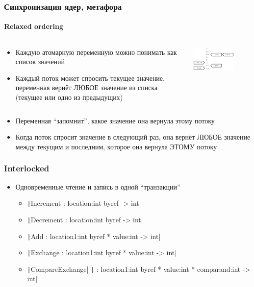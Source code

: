\documentclass[xetex,mathserif,serif]{beamer}
\begin{document}
	\begin{frame}
		\frametitle{Синхронизация ядер, метафора}
		\framesubtitle{Relaxed ordering}
		\begin{columns}
			\begin{column}{0.6\textwidth}
				\begin{itemize}
					\item Каждую атомарную переменную можно понимать как список значений
					\item Каждый поток может спросить текущее значение, переменная вернёт ЛЮБОЕ значение из списка (текущее или одно из предыдущих)
				\end{itemize}
			\end{column}
			\begin{column}{0.4\textwidth}
				\begin{center}
					\includegraphics[width=0.7\textwidth]{relaxedOrdering.png}
				\end{center}
			\end{column}
		\end{columns}
		\begin{itemize}
			\item Переменная ``запомнит'', какое значение она вернула этому потоку
			\item Когда поток спросит значение в следующий раз, она вернёт ЛЮБОЕ значение между текущим и последним, которое она вернула ЭТОМУ потоку
		\end{itemize}
	\end{frame}

	\begin{frame}
		\frametitle{Interlocked}
		\begin{itemize}
			\item Одновременные чтение и запись в одной ``транзакции''
			\begin{itemize}
				\item \texttt|Increment : location:int byref -> int|
				\item \texttt|Decrement : location:int byref -> int|
				\item \texttt|Add : location1:int byref * value:int -> int|
				\item \texttt|Exchange : location1:int byref * value:int -> int|
				\item \texttt|CompareExchange|
						\texttt|        : location1:int byref * value:int * comparand:int -> int|
			\end{itemize}
		\end{itemize}
	\end{frame}
\end{document}
